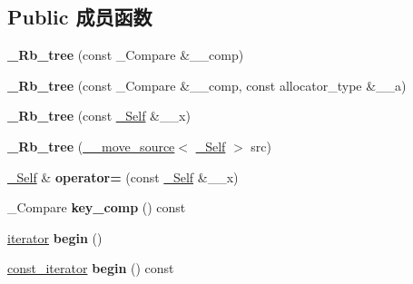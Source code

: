 \subsection*{Public 成员函数}
\begin{DoxyCompactItemize}
\item 
\mbox{\label{class___rb__tree_a046e86cd002e4c2802bb26c4bb7c0044}} 
{\bfseries \+\_\+\+Rb\+\_\+tree} (const \+\_\+\+Compare \&\+\_\+\+\_\+comp)
\item 
\mbox{\label{class___rb__tree_ace2f35110a37d9ae54510c10cfeedd81}} 
{\bfseries \+\_\+\+Rb\+\_\+tree} (const \+\_\+\+Compare \&\+\_\+\+\_\+comp, const allocator\+\_\+type \&\+\_\+\+\_\+a)
\item 
\mbox{\label{class___rb__tree_ab9fd048c4fc21ba02d1ae9654a79f628}} 
{\bfseries \+\_\+\+Rb\+\_\+tree} (const \hyperlink{class___rb__tree}{\+\_\+\+Self} \&\+\_\+\+\_\+x)
\item 
\mbox{\label{class___rb__tree_a0a615c7749fb4638e794865d46d7d63c}} 
{\bfseries \+\_\+\+Rb\+\_\+tree} (\hyperlink{class____move__source}{\+\_\+\+\_\+move\+\_\+source}$<$ \hyperlink{class___rb__tree}{\+\_\+\+Self} $>$ src)
\item 
\mbox{\label{class___rb__tree_ac76b589ceff19b1079d8021b6cc1969c}} 
\hyperlink{class___rb__tree}{\+\_\+\+Self} \& {\bfseries operator=} (const \hyperlink{class___rb__tree}{\+\_\+\+Self} \&\+\_\+\+\_\+x)
\item 
\mbox{\label{class___rb__tree_a1dec96808160f238cc9384187c6f2bc6}} 
\+\_\+\+Compare {\bfseries key\+\_\+comp} () const
\item 
\mbox{\label{class___rb__tree_a486abe49327f50c6b0ff37ee49b9613e}} 
\hyperlink{struct___rb__tree__iterator}{iterator} {\bfseries begin} ()
\item 
\mbox{\label{class___rb__tree_a254b33f105ef2a436405d00cce4df727}} 
\hyperlink{struct___rb__tree__iterator}{const\+\_\+iterator} {\bfseries begin} () const
\item 
\mbox{\label{class___rb__tree_a95e0a2f7e0945e25395673a8fa4fa7f9}} 

\end{DoxyCompactItemize}
